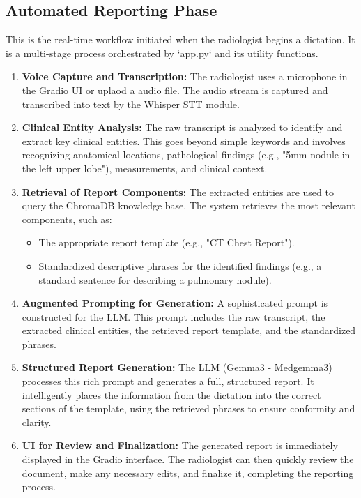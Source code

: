 \subsection{Automated Reporting Phase}
This is the real-time workflow initiated when the radiologist begins a dictation. It is a multi-stage process orchestrated by `app.py` and its utility functions.
\begin{enumerate}
    \item \textbf{Voice Capture and Transcription:} The radiologist uses a microphone in the Gradio UI or uplaod a audio file. The audio stream is captured and transcribed into text by the Whisper STT module.
    \item \textbf{Clinical Entity Analysis:} The raw transcript is analyzed to identify and extract key clinical entities. This goes beyond simple keywords and involves recognizing anatomical locations, pathological findings (e.g., "5mm nodule in the left upper lobe"), measurements, and clinical context.
    \item \textbf{Retrieval of Report Components:} The extracted entities are used to query the ChromaDB knowledge base. The system retrieves the most relevant components, such as:
        \begin{itemize}
            \item The appropriate report template (e.g., "CT Chest Report").
            \item Standardized descriptive phrases for the identified findings (e.g., a standard sentence for describing a pulmonary nodule).
        \end{itemize}
    \item \textbf{Augmented Prompting for Generation:} A sophisticated prompt is constructed for the LLM. This prompt includes the raw transcript, the extracted clinical entities, the retrieved report template, and the standardized phrases.
    \item \textbf{Structured Report Generation:} The LLM (Gemma3 - Medgemma3) processes this rich prompt and generates a full, structured report. It intelligently places the information from the dictation into the correct sections of the template, using the retrieved phrases to ensure conformity and clarity.
    \item \textbf{UI for Review and Finalization:} The generated report is immediately displayed in the Gradio interface. The radiologist can then quickly review the document, make any necessary edits, and finalize it, completing the reporting process.
\end{enumerate}

